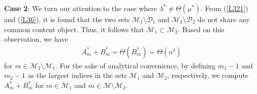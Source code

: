 \documentclass[10pt,journal,compsoc,onecolumn]{IEEEtran}
\begin{document}
{\bf Case 2}: We turn our attention to the case where
$\lambda^*\neq\Theta\left(\mu^*\right)$. From (\ref{L321}) and
(\ref{L36}), it is found that the two sets $\mathcal{M}_1\setminus
\mathcal{D}_1$ and $\mathcal{M}_3\setminus \mathcal{D}_2$ do not
share any common content object. Thus, it follows that
$\mathcal{M}_1\subset\mathcal{M}_2$. Based on this observation, we
have
\begin{align}
\label{T1} A_m^*+B_m^*=\Theta(B_m^*)=\Theta\left(n^\delta\right)
\end{align}
for $m \in \mathcal{M}_2\setminus\mathcal{M}_1$. For the sake of
analytical convenience, by defining $m_1-1$ and $m_2-1$ as the
largest indices in the sets $\mathcal{M}_1$ and $\mathcal{M}_2$,
respectively, we compute $A_m^*+B_m^*$ for $m\in\mathcal{M}_1$ and
$m\in\mathcal{M}\setminus\mathcal{M}_2$.
\end{document}
